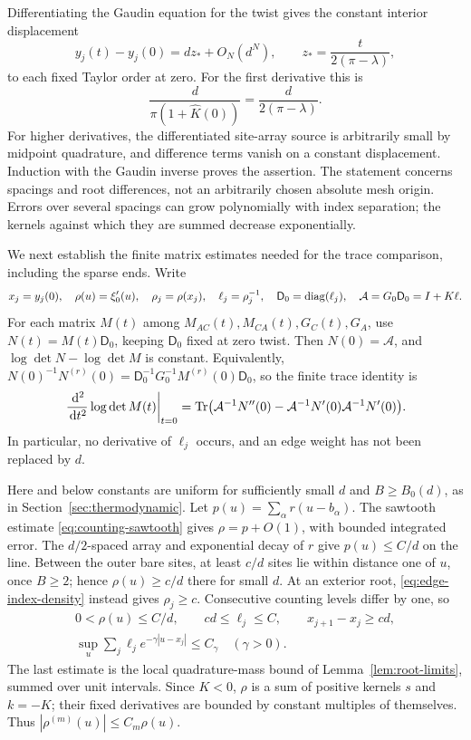 Differentiating the Gaudin equation for the twist gives the constant
interior displacement
\[
 y_j(t)-y_j(0)
   = d z_*+O_N(d^N),\qquad
 z_*=\frac{t}{2(\pi-\lambda)},
\]
to each fixed Taylor order at zero. For the first derivative this is
\[
 \frac{d}{\pi(1+\widehat K(0))}
       =\frac{d}{2(\pi-\lambda)}.
\]
For higher derivatives, the differentiated site-array source is
arbitrarily small by midpoint quadrature, and difference terms vanish
on a constant displacement. Induction with the Gaudin inverse proves the
assertion. The statement concerns spacings and root differences, not an
arbitrarily chosen absolute mesh origin. Errors over several spacings
can grow polynomially with index separation; the kernels against which
they are summed decrease exponentially.

We next establish the finite matrix estimates needed for the trace
comparison, including the sparse ends. Write
\[
 x_j=y_j(0),\quad \rho(u)=\xi_0'(u),\quad
 \rho_j=\rho(x_j),\quad \ell_j=\rho_j^{-1},\quad
 \mathsf D_0=\operatorname{diag}(\ell_j),\quad \mathcal A=G_0\mathsf D_0=I+K\ell.
\]
For each matrix \(M(t)\) among \(M_{AC}(t),M_{CA}(t),G_C(t),G_A\),
use \(N(t)=M(t)\mathsf D_0\), keeping \(\mathsf D_0\) fixed at zero twist.
Then \(N(0)=\mathcal A\), and \(\log\det N-\log\det M\) is constant.
Equivalently, \(N(0)^{-1}N^{(r)}(0)
=\mathsf D_0^{-1}G_0^{-1}M^{(r)}(0)\mathsf D_0\), so the finite trace identity is
\begin{equation}\label{eq:second-log-trace}
 \left.\frac{\,\mathrm d^2}{\,\mathrm d t^2}\log\det M(t)\right|_{t=0}
 =\operatorname{Tr}\bigl(\mathcal A^{-1}N''(0)
       -\mathcal A^{-1}N'(0)\mathcal A^{-1}N'(0)\bigr).
\end{equation}
In particular, no derivative of \(\ell_j\) occurs, and an edge weight
has not been replaced by \(d\).

Here and below constants are uniform for sufficiently small \(d\) and
\(B\ge B_0(d)\), as in Section~\ref{sec:thermodynamic}.
Let \(p(u)=\sum_\alpha r(u-b_\alpha)\).
The sawtooth estimate \eqref{eq:counting-sawtooth} gives
\(\rho=p+O(1)\), with bounded integrated error.
The \(d/2\)-spaced array and exponential decay of \(r\) give
\(p(u)\le C/d\) on the line. Between the outer bare sites,
at least \(c/d\) sites lie within distance one of \(u\), once \(B\ge2\);
hence \(\rho(u)\ge c/d\) there for small \(d\).
At an exterior root, \eqref{eq:edge-index-density} instead gives
\(\rho_j\ge c\). Consecutive counting levels differ by one, so
\begin{equation}\label{eq:overlap-finite-array-bounds}
 \begin{gathered}
 0<\rho(u)\le C/d,\qquad cd\le\ell_j\le C,
 \qquad x_{j+1}-x_j\ge cd,\\
 \sup_u\sum_j\ell_j e^{-\gamma|u-x_j|}\le C_\gamma
 \quad(\gamma>0).
 \end{gathered}
\end{equation}
The last estimate is the local quadrature-mass bound of
Lemma~\ref{lem:root-limits}, summed over unit intervals.
Since \(K<0\), \(\rho\) is a sum of positive kernels \(s\) and
\(k=-K\); their fixed derivatives are bounded by constant multiples
of themselves. Thus \(|\rho^{(m)}(u)|\le C_m\rho(u)\).

